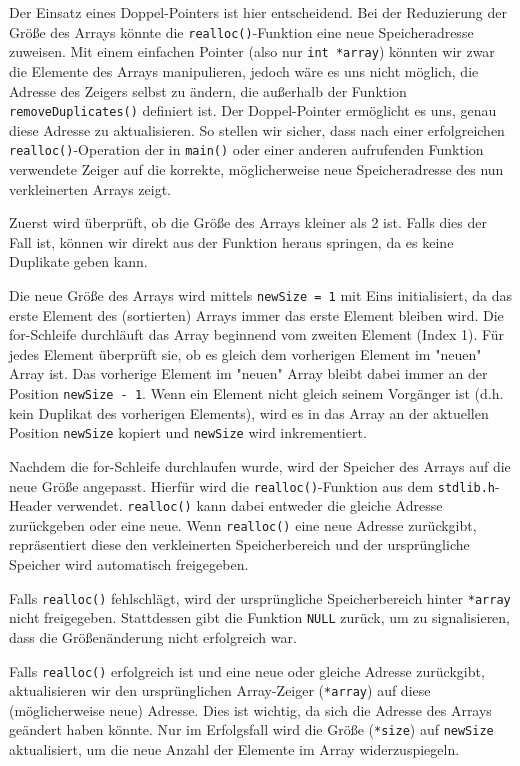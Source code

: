 Der Einsatz eines Doppel-Pointers ist hier entscheidend. Bei der Reduzierung der
Größe des Arrays könnte die \texttt{realloc()}-Funktion eine neue
Speicheradresse zuweisen. Mit einem einfachen Pointer (also nur
\texttt{int *array}) könnten wir zwar die Elemente des Arrays
manipulieren, jedoch wäre es uns nicht möglich, die Adresse des Zeigers selbst
zu ändern, die außerhalb der Funktion \texttt{removeDuplicates()}
definiert ist. Der Doppel-Pointer ermöglicht es uns, genau diese Adresse zu
aktualisieren. So stellen wir sicher, dass nach einer erfolgreichen
\texttt{realloc()}-Operation der in \texttt{main()} oder einer
anderen aufrufenden Funktion verwendete Zeiger auf die korrekte, möglicherweise
neue Speicheradresse des nun verkleinerten Arrays zeigt.

Zuerst wird überprüft, ob die Größe des Arrays kleiner als 2 ist. Falls dies der
Fall ist, können wir direkt aus der Funktion heraus springen, da es keine
Duplikate geben kann.

Die neue Größe des Arrays wird mittels \texttt{newSize = 1} mit Eins
initialisiert, da das erste Element des (sortierten) Arrays immer das erste
Element bleiben wird. Die for-Schleife durchläuft das Array beginnend vom
zweiten Element (Index 1). Für jedes Element überprüft sie, ob es gleich dem
vorherigen Element im "neuen" Array ist. Das vorherige Element im "neuen" Array
bleibt dabei immer an der Position \texttt{newSize - 1}. Wenn ein Element
nicht gleich seinem Vorgänger ist (d.h. kein Duplikat des vorherigen Elements),
wird es in das Array an der aktuellen Position \texttt{newSize} kopiert
und \texttt{newSize} wird inkrementiert.

Nachdem die for-Schleife durchlaufen wurde, wird der Speicher des Arrays auf die
neue Größe angepasst. Hierfür wird die \texttt{realloc()}-Funktion aus
dem \texttt{stdlib.h}-Header verwendet. \texttt{realloc()} kann
dabei entweder die gleiche Adresse zurückgeben oder eine neue. Wenn
\texttt{realloc()} eine neue Adresse zurückgibt, repräsentiert diese den
verkleinerten Speicherbereich und der ursprüngliche Speicher wird automatisch
freigegeben.

Falls \texttt{realloc()} fehlschlägt, wird der ursprüngliche
Speicherbereich hinter \texttt{*array} nicht freigegeben. Stattdessen
gibt die Funktion \texttt{NULL} zurück, um zu signalisieren, dass die
Größenänderung nicht erfolgreich war.

Falls \texttt{realloc()} erfolgreich ist und eine neue oder gleiche
Adresse zurückgibt, aktualisieren wir den ursprünglichen Array-Zeiger
(\texttt{*array}) auf diese (möglicherweise neue) Adresse. Dies ist
wichtig, da sich die Adresse des Arrays geändert haben könnte. Nur im
Erfolgsfall wird die Größe (\texttt{*size}) auf \texttt{newSize}
aktualisiert, um die neue Anzahl der Elemente im Array widerzuspiegeln.

